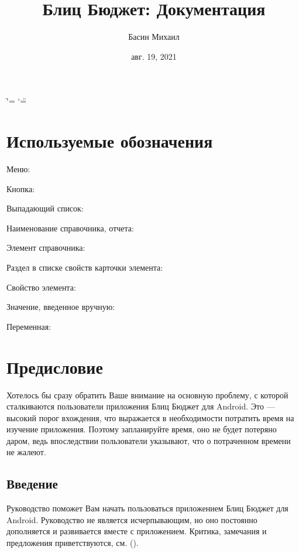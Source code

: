 \documentclass[a4paper,10pt,russian]{sphinxmanual}
\title{Блиц Бюджет: Документация}
\date{авг. 19, 2021}
\author{Басин Михаил}
\begin{document}
\ifdefined\shorthandoff
  \ifnum\catcode`\=\string=\active\shorthandoff{=}\fi
  \ifnum\catcode`\"=\active{}\fi
\fi

\pagestyle{empty}
\sphinxmaketitle
\pagestyle{plain}
\sphinxtableofcontents
\pagestyle{normal}
\label{\detokenize{index::doc}}



\chapter{Используемые обозначения}
\label{\detokenize{notations:id1}}\label{\detokenize{notations::doc}}
Меню: 

Кнопка: 

Выпадающий список: 

Наименование справочника, отчета: 

Элемент справочника: 

Раздел в списке свойств карточки элемента: 

Свойство элемента: 

Значение, введенное вручную:  

Переменная: 


\chapter{Предисловие}
\label{\detokenize{preface:id1}}\label{\detokenize{preface::doc}}
Хотелось бы сразу обратить Ваше внимание на основную проблему, с которой сталкиваются пользователи приложения Блиц Бюджет для Android. Это — высокий порог вхождения,
что выражается в необходимости потратить время на изучение приложения. Поэтому запланируйте время, оно не будет потеряно даром, ведь впоследствии
пользователи указывают, что о потраченном времени не жалеют.


\section{Введение}
\label{\detokenize{preface:id2}}
Руководство поможет Вам начать пользоваться приложением Блиц Бюджет для Android. Руководство не является исчерпывающим, но оно
постоянно дополняется и развивается вместе с приложением. Критика, замечания и предложения приветствуются,
см. {\hyperref[\detokenize{preface:id5}]{}} ().
\end{document}
